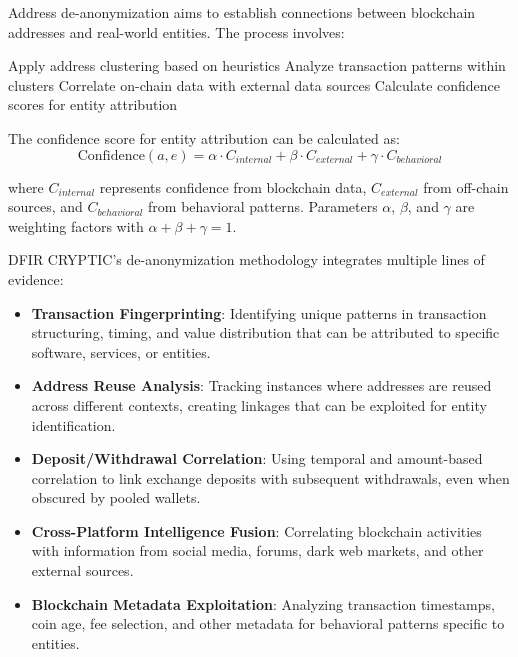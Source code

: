\documentclass[conference]{IEEEtran}
\begin{document}
Address de-anonymization aims to establish connections between blockchain addresses and real-world entities. The process involves:

\begin{algorithm}
\caption{Entity Identification Process}
\begin{algorithmic}[1]
\State Apply address clustering based on heuristics
\State Analyze transaction patterns within clusters
\State Correlate on-chain data with external data sources
\State Calculate confidence scores for entity attribution
\end{algorithmic}
\end{algorithm}

The confidence score for entity attribution can be calculated as:
\begin{equation}
\text{Confidence}(a, e) = \alpha \cdot C_{internal} + \beta \cdot C_{external} + \gamma \cdot C_{behavioral}
\end{equation}

where $C_{internal}$ represents confidence from blockchain data, $C_{external}$ from off-chain sources, and $C_{behavioral}$ from behavioral patterns. Parameters $\alpha$, $\beta$, and $\gamma$ are weighting factors with $\alpha + \beta + \gamma = 1$.

DFIR CRYPTIC's de-anonymization methodology integrates multiple lines of evidence:

\begin{itemize}
    \item \textbf{Transaction Fingerprinting}: Identifying unique patterns in transaction structuring, timing, and value distribution that can be attributed to specific software, services, or entities.
    
    \item \textbf{Address Reuse Analysis}: Tracking instances where addresses are reused across different contexts, creating linkages that can be exploited for entity identification.
    
    \item \textbf{Deposit/Withdrawal Correlation}: Using temporal and amount-based correlation to link exchange deposits with subsequent withdrawals, even when obscured by pooled wallets.
    
    \item \textbf{Cross-Platform Intelligence Fusion}: Correlating blockchain activities with information from social media, forums, dark web markets, and other external sources.
    
    \item \textbf{Blockchain Metadata Exploitation}: Analyzing transaction timestamps, coin age, fee selection, and other metadata for behavioral patterns specific to entities.
\end{itemize}
\end{document}
